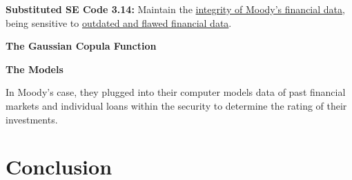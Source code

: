 \documentclass[11pt]{article}
\begin{document}
\begin{multicols}{2}
\begin{framed}
\noindent
   \textbf{Substituted SE Code 3.14: } 
   \newline
   Maintain the \underline{integrity of Moody's financial data}, being sensitive to \underline{outdated and flawed financial data}.
\end{framed}

\textbf{The Gaussian Copula Function}



\textbf{The Models}

 In Moody's case, they plugged into their computer models data of past financial markets and individual loans within the security to determine the rating of their investments.\cite{wiredFormula} 

\section{Conclusion}

\end{multicols}
\newpage


\nocite{*}




\end{document}
